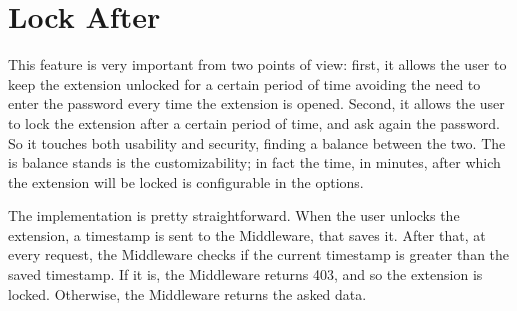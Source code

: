 \section{Lock After}

This feature is very important from two points of view: first, it allows the user to keep the extension unlocked for a certain period of time avoiding the need to enter the password every time the extension is opened. Second, it allows the user to lock the extension after a certain period of time, and ask again the password. So it touches both usability and security, finding a balance between the two. The is balance stands is the customizability; in fact the time, in minutes, after which the extension will be locked is configurable in the options. 

The implementation is pretty straightforward. When the user unlocks the extension, a timestamp is sent to the Middleware, that saves it. After that, at every request, the Middleware checks if the current timestamp is greater than the saved timestamp. If it is, the Middleware returns 403, and so the extension is locked. Otherwise, the Middleware returns the asked data. 
